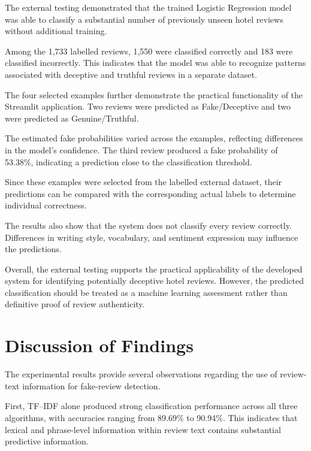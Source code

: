 \documentclass[12pt,a4paper]{report}
\begin{document}
The external testing demonstrated that the
trained Logistic Regression model was able to
classify a substantial number of previously
unseen hotel reviews without additional training.

Among the 1,733 labelled reviews, 1,550 were
classified correctly and 183 were classified
incorrectly. This indicates that the model
was able to recognize patterns associated
with deceptive and truthful reviews in
a separate dataset.

The four selected examples further demonstrate
the practical functionality of the Streamlit
application. Two reviews were predicted as
Fake/Deceptive and two were predicted as
Genuine/Truthful.

The estimated fake probabilities varied across
the examples, reflecting differences in the
model's confidence. The third review produced
a fake probability of 53.38\%, indicating
a prediction close to the classification
threshold.

Since these examples were selected from the
labelled external dataset, their predictions
can be compared with the corresponding actual
labels to determine individual correctness.

The results also show that the system does not
classify every review correctly. Differences
in writing style, vocabulary, and sentiment
expression may influence the predictions.

Overall, the external testing supports the
practical applicability of the developed
system for identifying potentially deceptive
hotel reviews. However, the predicted
classification should be treated as a
machine learning assessment rather than
definitive proof of review authenticity.


\section{Discussion of Findings}

The experimental results provide several observations regarding the
use of review-text information for fake-review detection.

First, TF--IDF alone produced strong classification performance across
all three algorithms, with accuracies ranging from 89.69\% to 90.94\%.
This indicates that lexical and phrase-level information within review
text contains substantial predictive information.
\end{document}
